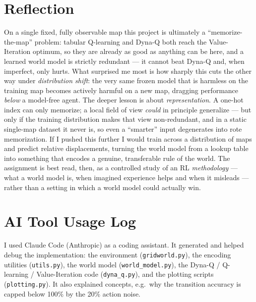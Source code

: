 \documentclass[11pt]{article}
\begin{document}
\section{Reflection}\label{sec:reflection}
On a single fixed, fully observable map this project is ultimately a
``memorize-the-map'' problem: tabular Q-learning and Dyna-Q both reach the
Value-Iteration optimum, so they are already as good as anything can be here, and
a learned world model is strictly redundant --- it cannot beat Dyna-Q and, when
imperfect, only hurts. What surprised me most is how sharply this cuts the other
way under \emph{distribution shift}: the very same frozen model that is harmless
on the training map becomes actively harmful on a new map, dragging performance
\emph{below} a model-free agent. The deeper lesson is about \emph{representation}.
A one-hot index can only memorize; a local field of view \emph{could} in
principle generalize --- but only if the training distribution makes that view
non-redundant, and in a static single-map dataset it never is, so even a
``smarter'' input degenerates into rote memorization. If I pushed this further I
would train across a distribution of maps and predict relative displacements,
turning the world model from a lookup table into something that encodes a
genuine, transferable rule of the world. The assignment is best read, then, as a
controlled study of an RL \emph{methodology} --- what a world model is, when
imagined experience helps and when it misleads --- rather than a setting in which
a world model could actually win.

\section{AI Tool Usage Log}\label{sec:ailog}
I used Claude Code (Anthropic) as a coding assistant. It generated and helped
debug the implementation: the environment (\texttt{gridworld.py}), the encoding
utilities (\texttt{utils.py}), the world model (\texttt{world\_model.py}), the
Dyna-Q / Q-learning / Value-Iteration code (\texttt{dyna\_q.py}), and the
plotting scripts (\texttt{plotting.py}). It also explained concepts, e.g.\ why
the transition accuracy is capped below 100\% by the 20\% action noise.
\end{document}
